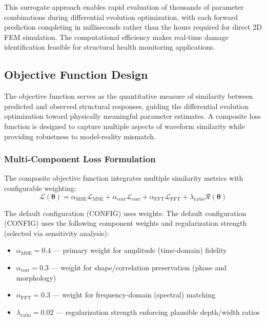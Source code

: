 \documentclass[12pt,a4paper]{report}
\begin{document}
This surrogate approach enables rapid evaluation of thousands of parameter combinations during differential evolution optimization, with each forward prediction completing in milliseconds rather than the hours required for direct 2D FEM simulation. The computational efficiency makes real-time damage identification feasible for structural health monitoring applications.


\subsection{Objective Function Design}
\label{sec:objective_function}

The objective function serves as the quantitative measure of similarity between predicted and observed structural responses, guiding the differential evolution optimization toward physically meaningful parameter estimates. A composite loss function is designed to capture multiple aspects of waveform similarity while providing robustness to model-reality mismatch.

\subsubsection{Multi-Component Loss Formulation}
The composite objective function integrates multiple similarity metrics with configurable weighting:
\begin{equation}
\mathcal{L}(\boldsymbol{\theta}) = \alpha_{\text{MSE}} \mathcal{L}_{\text{MSE}} + \alpha_{\text{corr}} \mathcal{L}_{\text{corr}} + \alpha_{\text{FFT}} \mathcal{L}_{\text{FFT}} + \lambda_{\text{ratio}} \mathcal{R}(\boldsymbol{\theta})
\label{eq:composite_loss}
\end{equation}

The default configuration (CONFIG) uses weights:
The default configuration (CONFIG) uses the following component weights and regularization strength (selected via sensitivity analysis):
\begin{itemize}
    \item $\alpha_{\text{MSE}} = 0.4$ — primary weight for amplitude (time-domain) fidelity
    \item $\alpha_{\text{corr}} = 0.3$ — weight for shape/correlation preservation (phase and morphology)
    \item $\alpha_{\text{FFT}} = 0.3$ — weight for frequency-domain (spectral) matching
    \item $\lambda_{\text{ratio}} = 0.02$ — regularization strength enforcing plausible depth/width ratios
\end{itemize}
\end{document}
